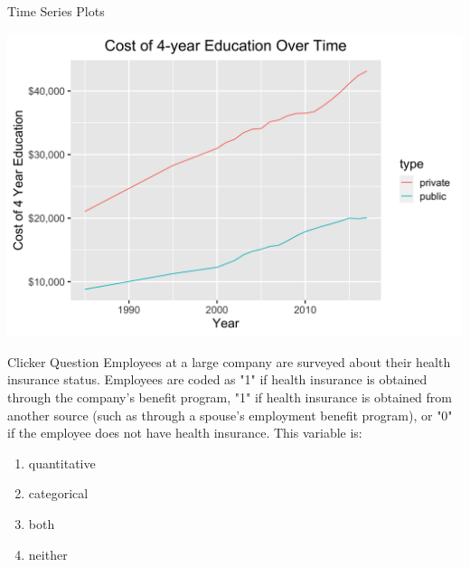 \documentclass{beamer}
\begin{document}
\begin{frame}{Time Series Plots}
    \begin{center}
        \includegraphics[width= \linewidth]{timeseries.png}
    \end{center}
\end{frame}

\begin{frame}{Clicker Question}
    Employees at a large company are surveyed about their health insurance status. Employees are coded as "1" if health insurance is obtained through the company's benefit program, "1" if health insurance is obtained from another source (such as through a spouse's employment benefit program), or "0" if the employee does not have health insurance. This variable is:

    \begin{enumerate}[label=(\alph*)]
        \item quantitative
        \item categorical
        \item both
        \item neither
    \end{enumerate}
\end{frame}
\end{document}
